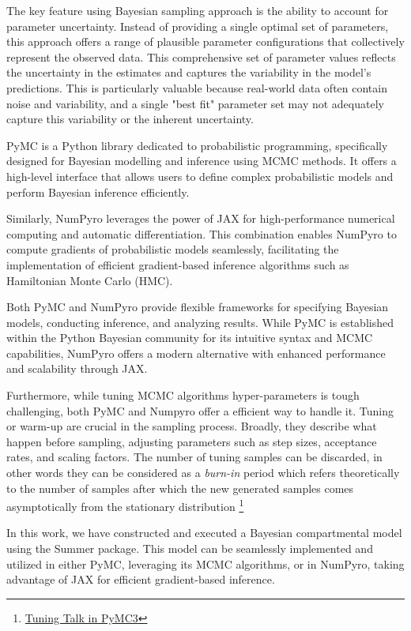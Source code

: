 \documentclass[nonatbib,preprint,12pt,authoryear]{elsarticle}
\begin{document}
The key feature using Bayesian sampling approach is the ability to account for parameter uncertainty. Instead of providing a single optimal set of parameters, this approach offers a range of plausible parameter configurations that collectively represent the observed data. This comprehensive set of parameter values reflects the uncertainty in the estimates and captures the variability in the model's predictions. This is particularly valuable because real-world data often contain noise and variability, and a single "best fit" parameter set may not adequately capture this variability or the inherent uncertainty.%

PyMC \cite{pymc2023} is a Python library dedicated to probabilistic programming, specifically designed for Bayesian modelling and inference using MCMC methods. It offers a high-level interface that allows users to define complex probabilistic models and perform Bayesian inference efficiently.

Similarly, NumPyro \cite{bingham2019pyro} \cite{phan2019composable} leverages the power of JAX for high-performance numerical computing and automatic differentiation. This combination enables NumPyro to compute gradients of probabilistic models seamlessly, facilitating the implementation of efficient gradient-based inference algorithms such as Hamiltonian Monte Carlo (HMC).

Both PyMC and NumPyro provide flexible frameworks for specifying Bayesian models, conducting inference, and analyzing results. While PyMC is established within the Python Bayesian community for its intuitive syntax and MCMC capabilities, NumPyro offers a modern alternative with enhanced performance and scalability through JAX.

Furthermore, while tuning MCMC algorithms hyper-parameters is tough challenging, both PyMC and Numpyro offer a efficient way to handle it. Tuning or warm-up are crucial in the sampling process. Broadly, they describe what happen before sampling, adjusting parameters such as step sizes, acceptance rates, and scaling factors. The number of tuning samples can be discarded, in other words they can be considered as a \textit{burn-in} period which refers theoretically to the number of samples after which the new generated samples comes asymptotically from the stationary distribution \footnote{\href{https://colcarroll.github.io/hmc_tuning_talk/}{Tuning Talk in PyMC3}} 

In this work, we have constructed and executed a Bayesian compartmental model using the Summer package. This model can be seamlessly implemented and utilized in either PyMC, leveraging its MCMC algorithms, or in NumPyro, taking advantage of JAX for efficient gradient-based inference.
\end{document}
